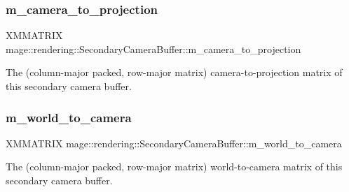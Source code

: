 \subsubsection{\texorpdfstring{m\+\_\+camera\+\_\+to\+\_\+projection}{m\_camera\_to\_projection}}
{\footnotesize\ttfamily X\+M\+M\+A\+T\+R\+IX mage\+::rendering\+::\+Secondary\+Camera\+Buffer\+::m\+\_\+camera\+\_\+to\+\_\+projection}

The (column-\/major packed, row-\/major matrix) camera-\/to-\/projection matrix of this secondary camera buffer. \hypertarget{structmage_1_1rendering_1_1_secondary_camera_buffer_a3f131146f9374058ace582bfae3e90b7}{}\label{structmage_1_1rendering_1_1_secondary_camera_buffer_a3f131146f9374058ace582bfae3e90b7} 
\subsubsection{\texorpdfstring{m\+\_\+world\+\_\+to\+\_\+camera}{m\_world\_to\_camera}}
{\footnotesize\ttfamily X\+M\+M\+A\+T\+R\+IX mage\+::rendering\+::\+Secondary\+Camera\+Buffer\+::m\+\_\+world\+\_\+to\+\_\+camera}

The (column-\/major packed, row-\/major matrix) world-\/to-\/camera matrix of this secondary camera buffer. 